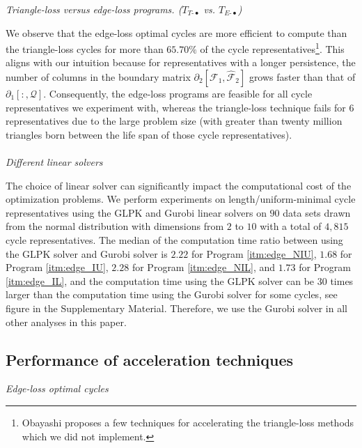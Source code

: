 \documentclass[11pt,onecolumn]{article}
\newcommand{\pr}{Program }
\theoremstyle{plain}
\theoremstyle{definition}
\begin{document}
\vspace{.1in}
\noindent \emph{Triangle-loss versus edge-loss programs. ($T_{T\text{-}\bullet}$ vs. $T_{E\text{-}\bullet}$)} 

We observe that the edge-loss optimal cycles are more efficient to compute than the triangle-loss cycles for more than $65.70\%$ of the cycle representatives\footnote{Obayashi \cite{Obayashi2018} proposes a few techniques for accelerating the triangle-loss methods which we did not implement.}. This aligns with our intuition because for representatives with a longer persistence, the number of columns in the boundary matrix $\partial_{2}[ \mathcal{F}_1 , \hat {\mathcal{F}}_{2} ]$ grows faster than that of $\partial_1[:, \mathcal{Q}]$. Consequently, the edge-loss programs are feasible for all cycle representatives we experiment with, whereas the triangle-loss technique fails for $6$ representatives due to the large problem size (with greater than twenty million triangles born between the life span of those cycle representatives).
\\ \\
\noindent \emph{Different linear solvers}

The choice of linear solver can significantly impact the computational cost of the optimization problems. We perform experiments on length/uniform-minimal cycle representatives using the GLPK \cite{glpk} and Gurobi \cite{gurobi} linear solvers on $90$ data sets drawn from the normal distribution with dimensions from $2$ to $10$ with a total of $4{,}815$ cycle representatives. The median of the computation time ratio between using the GLPK solver and Gurobi solver is $2.22$ for \pr
\ref{itm:edge_NIU}, $1.68$ for \pr \ref{itm:edge_IU}, $2.28$ for \pr \ref{itm:edge_NIL}, and $1.73$ for \pr \ref{itm:edge_IL}, and the computation time using the GLPK solver can be $30$ times larger than the computation time using the Gurobi solver for some cycles, see figure in the Supplementary Material. Therefore, we use the Gurobi solver in all other analyses in this paper. 



 

\subsection{Performance of acceleration techniques} \label{accelerateresults}
\vspace{0.1in}
\noindent \emph{Edge-loss optimal cycles} 
\end{document}
